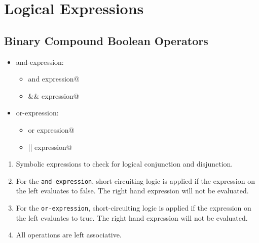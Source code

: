 \section{Logical Expressions}\label{sec: Logical Expressions}

\subsection{Binary Compound Boolean Operators}
\begin{itemize}[before=\itshape, label={}]
	\item and-expression:
	\begin{itemize}[before=\itshape, label={}]
		\item \lstinline@expression and expression@
		\item \lstinline@expression && expression@
	\end{itemize}
	\item or-expression:
	\begin{itemize}[before=\itshape, label={}]
		\item \lstinline@expression or expression@
		\item \lstinline@expression || expression@
	\end{itemize}
\end{itemize}
\begin{enumerate}
	\item Symbolic expressions to check for logical conjunction and disjunction.
	\item For the \lstinline|and-expression|, short-circuiting logic is applied if the expression on the left evaluates to false. The right hand expression will not be evaluated.
	\item For the \lstinline|or-expression|, short-circuiting logic is applied if the expression on the left evaluates to true. The right hand expression will not be evaluated.
	\item All operations are left associative.
\end{enumerate}

